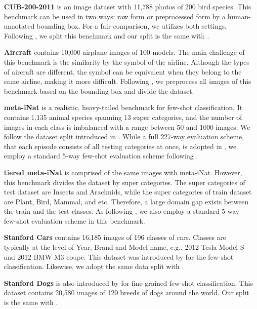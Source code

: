 \noindent\textbf{CUB-200-2011}\cite{wah2011caltech} is an image dataset with 11,788 photos of 200 bird species. 
This benchmark can be used in two ways: raw form\cite{chen2019closer} or preprocessed form by a human-annotated bounding box\cite{ye2020few, zhang2020deepemd}. 
For a fair comparison, we utilizes both settings. 
Following \cite{chen2019closer}, we split this benchmark and our split is the same with \cite{wertheimer2021few}.

\noindent\textbf {Aircraft}\cite{maji2013fine} contains 10,000 airplane images of 100 models. 
The main challenge of this benchmark is the similarity by the symbol of the airline. 
Although the types of aircraft are different, the symbol can be equivalent when they belong to the same airline, making it more difficult. 
Following \cite{wertheimer2021few}, we preprocess all images of this benchmark based on the bounding box and divide the dataset.

\noindent\textbf{meta-iNat}\cite{wertheimer2019few, van2018inaturalist} is a realistic, heavy-tailed benchmark for few-shot classification. 
It contains 1,135 animal species spanning 13 super categories, and the number of images in each class is imbalanced with a range between 50 and 1000 images.
We follow the dataset split introduced in \cite{wertheimer2019few}. 
While a full 227-way evaluation scheme, that each episode consists of all testing categories at once, is adopted in \cite{wertheimer2019few}, we employ a standard 5-way few-shot evaluation scheme following \cite{wertheimer2021few}.

\noindent\textbf{tiered meta-iNat}\cite{wertheimer2019few} is comprised of the same images with meta-iNat.
However, this benchmark divides the dataset by super categories.
The super categories of test dataset are Insects and Arachnids, while the super categories of train dataset are Plant, Bird, Mammal, and etc. 
Therefore, a large domain gap exists between the train and the test classes. 
As following \cite{wertheimer2021few}, we also employ a standard 5-way few-shot evaluation scheme in this benchmark.


\noindent\textbf{Stanford Cars}\cite{krause20133d} contains 16,185 images of 196 classes of cars. 
Classes are typically at the level of Year, Brand and Model name, e.g., 2012 Tesla Model S and 2012 BMW M3 coupe. 
This dataset was introduced by \cite{li2019revisiting} for the few-shot classification.
Likewise, we adopt the same data split with \cite{li2019revisiting}. 


\noindent\textbf{Stanford Dogs}\cite{khosla2011novel} is also introduced by \cite{li2019revisiting} for fine-grained few-shot classification. This dataset contains 20,580 images of 120 breeds of dogs around the world. Our split is the same with \cite{li2019revisiting}.

